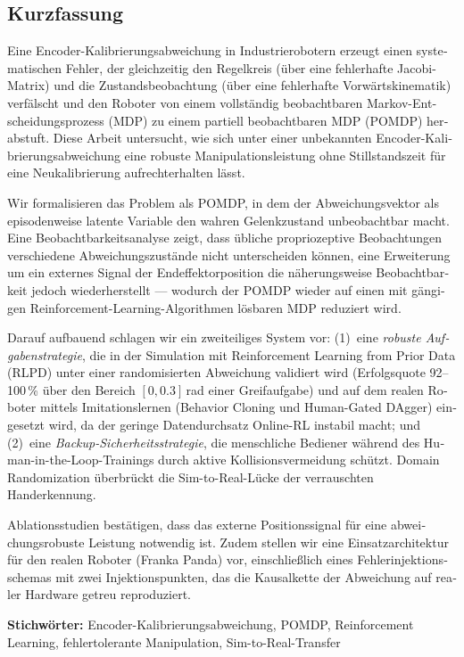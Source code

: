\cleardoublepage

\begin{otherlanguage}{ngerman}
\chapter*{Kurzfassung}

Eine Encoder-Kalibrierungsabweichung in Industrierobotern erzeugt einen systematischen Fehler, der gleichzeitig den Regelkreis (über eine fehlerhafte Jacobi-Matrix) und die Zustandsbeobachtung (über eine fehlerhafte Vorwärtskinematik) verfälscht und den Roboter von einem vollständig beobachtbaren Markov-Entscheidungsprozess (MDP) zu einem partiell beobachtbaren MDP (POMDP) herabstuft. Diese Arbeit untersucht, wie sich unter einer unbekannten Encoder-Kalibrierungsabweichung eine robuste Manipulationsleistung ohne Stillstandszeit für eine Neukalibrierung aufrechterhalten lässt.

Wir formalisieren das Problem als POMDP, in dem der Abweichungsvektor als episodenweise latente Variable den wahren Gelenkzustand unbeobachtbar macht. Eine Beobachtbarkeitsanalyse zeigt, dass übliche propriozeptive Beobachtungen verschiedene Abweichungszustände nicht unterscheiden können, eine Erweiterung um ein externes Signal der Endeffektorposition die näherungsweise Beobachtbarkeit jedoch wiederherstellt --- wodurch der POMDP wieder auf einen mit gängigen Reinforcement-Learning-Algorithmen lösbaren MDP reduziert wird.

Darauf aufbauend schlagen wir ein zweiteiliges System vor: (1)~eine \emph{robuste Aufgabenstrategie}, die in der Simulation mit Reinforcement Learning from Prior Data (RLPD) unter einer randomisierten Abweichung validiert wird (Erfolgsquote 92--100\,\% über den Bereich $[0, 0.3]$\,rad einer Greifaufgabe) und auf dem realen Roboter mittels Imitationslernen (Behavior Cloning und Human-Gated DAgger) eingesetzt wird, da der geringe Datendurchsatz Online-RL instabil macht; und (2)~eine \emph{Backup-Sicherheitsstrategie}, die menschliche Bediener während des Human-in-the-Loop-Trainings durch aktive Kollisionsvermeidung schützt. Domain Randomization überbrückt die Sim-to-Real-Lücke der verrauschten Handerkennung.

Ablationsstudien bestätigen, dass das externe Positionssignal für eine abweichungsrobuste Leistung notwendig ist. Zudem stellen wir eine Einsatzarchitektur für den realen Roboter (Franka Panda) vor, einschließlich eines Fehlerinjektionsschemas mit zwei Injektionspunkten, das die Kausalkette der Abweichung auf realer Hardware getreu reproduziert.

\medskip
\noindent\textbf{Stichwörter:} Encoder-Kalibrierungsabweichung, POMDP, Reinforcement Learning, fehlertolerante Manipulation, Sim-to-Real-Transfer
\end{otherlanguage}

